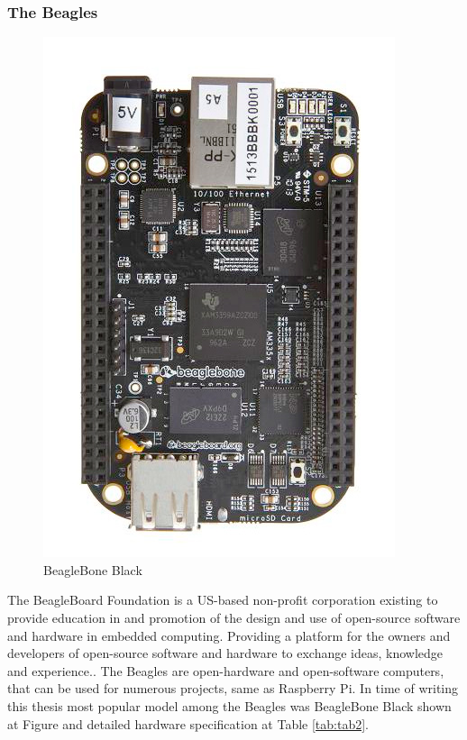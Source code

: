 \subsubsection{The Beagles} %
\label{ssub:the_beagles}
\begin{figure}[H]
\begin{center}
\captionsetup{font=small}
\includegraphics[scale=0.4]{pics/beagle.jpg}
\caption{BeagleBone Black\cite{beagle_pic}}
\label{fig:ch4}
\end{center}
\end{figure}
The BeagleBoard Foundation is a US-based non-profit corporation existing to provide education in and promotion of the design and use of open-source software and hardware in embedded computing. Providing a platform for the owners and developers of open-source software and hardware to exchange ideas, knowledge and experience.\cite{beagle_what}. The Beagles are open-hardware and open-software computers, that can be used for numerous projects, same as Raspberry Pi. In time of writing this thesis most popular model among the Beagles was BeagleBone Black shown at Figure and detailed hardware specification at Table \ref{tab:tab2}.
